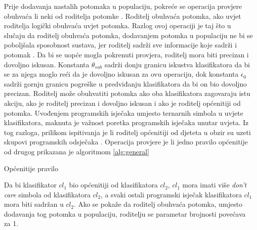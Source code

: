 \documentclass[times, utf8, zavrsni]{fer}
\begin{document}
Prije dodavanja nastalih potomaka u populaciju, pokreće se operacija provjere obuhvaća li neki od roditelja potomke .
Roditelj obuhvaća potomka, ako uvjet roditelja logički obuhvaća uvjet potomka.
Razlog ovoj operaciji je taj što u slučaju da roditelj obuhvaća potomka, dodavanjem potomka u populaciju ne bi se poboljšala sposobnost sustava, jer roditelj sadrži sve informacije koje sadrži i potomak \citep{1}.
Da bi se uopće mogla pokrenuti provjera, roditelj mora biti precizan i dovoljno iskusan.
Konstanta $\theta_{sub}$ sadrži donju granicu iskustva klasifikatora da bi se za njega moglo reći da je dovoljno iskusan za ovu operaciju, dok konstanta $\epsilon_{0}$ sadrži gornju granicu pogreške u predviđanju klasifikatora da bi on bio dovoljno precizan.
Roditelj može obuhvatiti potomka ako oba klasifikatora zagovaraju istu akciju, ako je roditelj precizan i dovoljno iskusan i ako je roditelj općenitiji od potomka.
Uvođenjem programskih isječaka umjesto ternarnih simbola u uvjete klasifikatora, maknuta je važnost poretka programskih isječaka unutar uvjeta.
Iz tog razloga, prilikom ispitivanja je li roditelj općenitiji od djeteta u obzir su uzeti skupovi programskih odsječaka \citep{4}.
Operacija provjere je li jedno pravilo općenitije od drugog prikazana je algoritmom \ref{alg:general}
\begin{algorithm}
    \caption{Općenitije pravilo}
    \label{alg:general}
    \begin{algorithmic}
        \ENDIF
        \ENDIF
    \end{algorithmic}
\end{algorithm}
Da bi klasifikator $cl_{1}$ bio općenitiji od klasifikatora $cl_{2}$, $cl_{1}$ mora imati više \emph{don't care} simbola od klasifikatora $cl_{2}$, a svaki ostali programski isječak klasifikatora $cl_{1}$ mora biti sadržan u $cl_{2}$.
Ako se pokaže da roditelj obuhvaća potomka, umjesto dodavanja tog potomka u populaciju, roditelju se parametar brojnosti povećava za 1.
\end{document}
